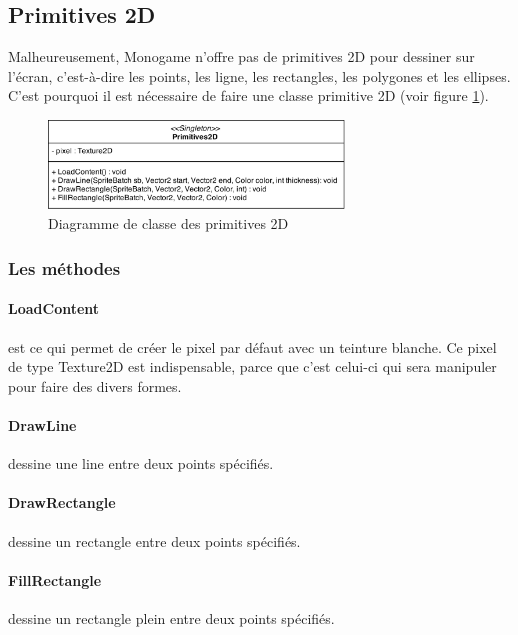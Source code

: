 \documentclass[11pt, a4paper, oneside]{report}
\begin{document}
\subsection{Primitives 2D}
Malheureusement, Monogame n'offre pas de primitives 2D pour dessiner sur l'écran, c'est-à-dire les points, les ligne, les rectangles, les polygones et les ellipses. C'est pourquoi il est nécessaire de faire une classe primitive 2D (voir figure \ref{fig:Primitives2D}).
\begin{figure}[h]
	\begin{center}
	\includegraphics[width=0.7\textwidth]{Primitives2D}
	\caption{Diagramme de classe des primitives 2D}
	\label{fig:Primitives2D}
	\end{center}
\end{figure}
\subsubsection{Les méthodes}
\paragraph{LoadContent} est ce qui permet de créer le pixel par défaut avec un teinture blanche. Ce pixel de type Texture2D est indispensable, parce que c'est celui-ci qui sera manipuler pour faire des divers formes.
\paragraph{DrawLine} dessine une line entre deux points spécifiés.
\paragraph{DrawRectangle} dessine un rectangle entre deux points spécifiés.
\paragraph{FillRectangle} dessine un rectangle plein entre deux points spécifiés.
\end{document}
